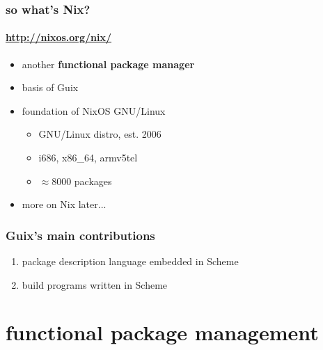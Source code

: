 \documentclass{beamer}
\begin{document}
\begin{frame}
  \frametitle{so what's Nix?}
  \framesubtitle{\url{http://nixos.org/nix/}}

  \begin{itemize}
  \item another \textbf{functional package manager}
  \item basis of Guix
  \item<2->{foundation of NixOS GNU/Linux
      \begin{itemize}
      \item GNU/Linux distro, est. 2006
      \item i686, x86\_64, armv5tel
      \item $\approx$8000 packages
      \end{itemize}
    }
  \item<3-> more on Nix later...
  \end{itemize}
\end{frame}

\begin{frame}
  \frametitle{Guix's main contributions}

  \large{
  \begin{enumerate}
    \item{package description language \alert{embedded in Scheme}
        }
    \item{\alert{build programs} written in Scheme
        }
  \end{enumerate}
  }
\end{frame}

\section{functional package management}
\end{document}

